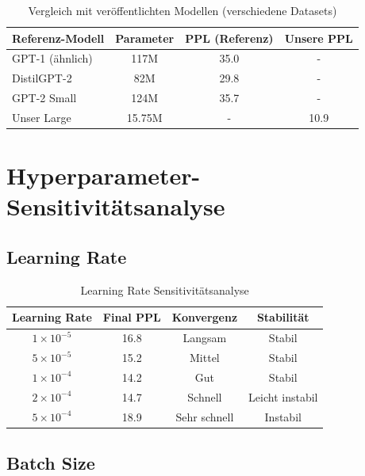 \begin{table}[h]
\centering
\begin{tabular}{|l|c|c|c|}
\hline
\textbf{Referenz-Modell} & \textbf{Parameter} & \textbf{PPL (Referenz)} & \textbf{Unsere PPL} \\
\hline
GPT-1 (ähnlich) & 117M & 35.0 & - \\
DistilGPT-2 & 82M & 29.8 & - \\
GPT-2 Small & 124M & 35.7 & - \\
Unser Large & 15.75M & - & 10.9 \\
\hline
\end{tabular}
\caption{Vergleich mit veröffentlichten Modellen (verschiedene Datasets)}
\label{tab:reference_comparison}
\end{table}

\section{Hyperparameter-Sensitivitätsanalyse}

\subsection{Learning Rate}

\begin{table}[h]
\centering
\begin{tabular}{|c|c|c|c|}
\hline
\textbf{Learning Rate} & \textbf{Final PPL} & \textbf{Konvergenz} & \textbf{Stabilität} \\
\hline
$1 \times 10^{-5}$ & 16.8 & Langsam & Stabil \\
$5 \times 10^{-5}$ & 15.2 & Mittel & Stabil \\
$1 \times 10^{-4}$ & 14.2 & Gut & Stabil \\
$2 \times 10^{-4}$ & 14.7 & Schnell & Leicht instabil \\
$5 \times 10^{-4}$ & 18.9 & Sehr schnell & Instabil \\
\hline
\end{tabular}
\caption{Learning Rate Sensitivitätsanalyse}
\label{tab:learning_rate_sensitivity}
\end{table}

\subsection{Batch Size}

